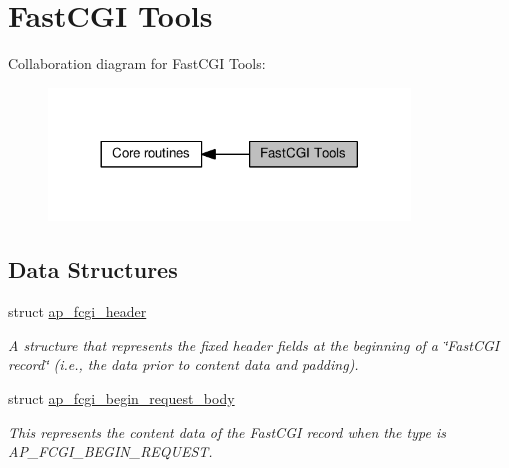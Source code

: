 \hypertarget{group__APACHE__CORE__FASTCGI}{}\section{Fast\+C\+GI Tools}
\label{group__APACHE__CORE__FASTCGI}
Collaboration diagram for Fast\+C\+GI Tools\+:
\nopagebreak
\begin{figure}[H]
\begin{center}
\leavevmode
\includegraphics[width=272pt]{group__APACHE__CORE__FASTCGI}
\end{center}
\end{figure}
\subsection*{Data Structures}
\begin{DoxyCompactItemize}
\item 
struct \hyperlink{structap__fcgi__header}{ap\+\_\+fcgi\+\_\+header}
\begin{DoxyCompactList}\small\item\em A structure that represents the fixed header fields at the beginning of a \char`\"{}\+Fast\+C\+G\+I record\char`\"{} (i.\+e., the data prior to content data and padding). \end{DoxyCompactList}\item 
struct \hyperlink{structap__fcgi__begin__request__body}{ap\+\_\+fcgi\+\_\+begin\+\_\+request\+\_\+body}
\begin{DoxyCompactList}\small\item\em This represents the content data of the Fast\+C\+GI record when the type is A\+P\+\_\+\+F\+C\+G\+I\+\_\+\+B\+E\+G\+I\+N\+\_\+\+R\+E\+Q\+U\+E\+ST. \end{DoxyCompactList}\end{DoxyCompactItemize}
